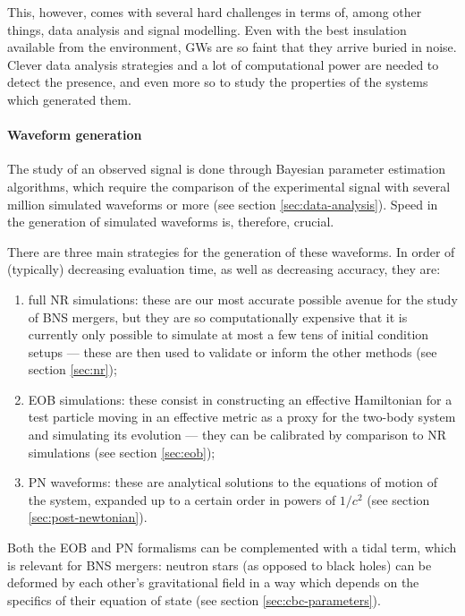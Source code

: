 \documentclass[main.tex]{subfiles}
\begin{document}
This, however, comes with several hard challenges in terms of, among other things, data analysis and signal modelling.
Even with the best insulation available from the environment, \acp{GW} are so faint that they arrive buried in noise. 
Clever data analysis strategies and a lot of computational power are needed to detect the presence, and even more so to study the properties of the systems which generated them.

\paragraph{Waveform generation}

The study of an observed signal is done through Bayesian parameter estimation algorithms, which require the comparison of the experimental signal with several million \cite{lackeyEffectiveonebodyWaveformsBinary2017} simulated waveforms or more (see section \ref{sec:data-analysis}).
Speed in the generation of simulated waveforms is, therefore, crucial.

There are three main strategies for the generation of these waveforms. In order of (typically) decreasing evaluation time, as well as decreasing accuracy, they are:
\begin{enumerate}
    \item full \ac{NR} simulations: these are our most accurate possible avenue for the study of \ac{BNS} mergers, but they are so computationally expensive that it is currently only possible to simulate at most a few tens of initial condition setups --- these are then used to validate or inform the other methods (see section \ref{sec:nr});
    \item \ac{EOB} simulations: these consist in constructing an effective Hamiltonian for a test particle moving in an effective metric as a proxy for the two-body system and simulating its evolution --- they can be calibrated by comparison to \ac{NR} simulations (see section \ref{sec:eob});
    \item \ac{PN} waveforms: these are analytical solutions to the equations of motion of the system, expanded up to a certain order in powers of $1/c^2$ (see section \ref{sec:post-newtonian}).
\end{enumerate}

Both the \ac{EOB} and \ac{PN} formalisms can be complemented with a tidal term, which is relevant for \ac{BNS} mergers: neutron stars (as opposed to black holes) can be deformed by each other's gravitational field in a way which depends on the specifics of their equation of state (see section \ref{sec:cbc-parameters}). 
\end{document}
